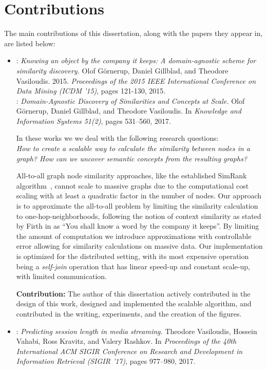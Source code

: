 \section{Contributions}

The main contributions of this dissertation, along with the papers they appear in,
are listed below:

\begin{itemize}
	\item \textbf{\conceptsicdm}: \emph{Knowing an object by the company it keeps: A domain-agnostic scheme for similarity discovery.}
	Olof G\"{o}rnerup, Daniel Gillblad, and Theodore Vasiloudis. 2015.
	\emph{Proceedings of the 2015 IEEE International Conference on Data Mining (ICDM '15)}, pages 121-130, 2015. \\
	\textbf{\conceptskais}: \emph{Domain-Agnostic Discovery of Similarities and Concepts at Scale.}
	Olof G\"{o}rnerup, Daniel Gillblad, and Theodore Vasiloudis. In \emph{Knowledge and
	Information Systems 51(2)}, pages 531--560, 2017.

	In these works we we deal with the following research questions:\\
	\emph{How to create a scalable way to calculate the similarity between nodes
	in a graph? How can we uncover semantic concepts from the resulting graphs?
	}

	All-to-all graph node similarity approaches, like the established SimRank algorithm~\cite{simrank},
	cannot scale to massive graphs due to the computational cost scaling with at least a quadratic
	factor in the number of nodes. Our approach is to approximate the all-to-all problem
	by limiting the similarity calculation to one-hop-neighborhoods, following the
	notion of context similarity as stated by Firth in \cite{firth} as ``You shall know
	a word by the company it keeps''. By limiting the amount of computation we introduce
	approximations with controllable error allowing for similarity calculations on massive
	data. Our implementation is optimized for the distributed setting, with its most
	expensive operation being a \emph{self-join} operation that has linear speed-up and
	constant scale-up, with limited communication.

	\textbf{Contribution:} The author of this dissertation actively contributed
	in the design of this work, designed and implemented the scalable algorithm, and contributed in
	the writing, experiments, and the creation of the figures.

	\item \textbf{\sessionlength}:
	\emph{Predicting session length in media streaming.} Theodore Vasiloudis, Hossein Vahabi, Ross Kravitz, and Valery Rashkov. In \emph{Proceedings of the 40th
	International ACM SIGIR Conference on Research and Development in Information
	Retrieval (SIGIR '17)}, pages 977--980, 2017.


\end{itemize}
